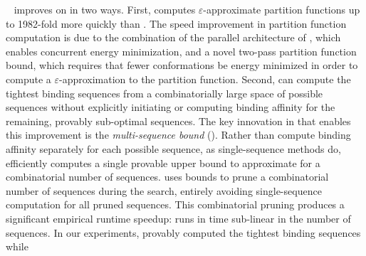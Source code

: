 \bbks~\cite{BBK*} improves on \ks in two ways. First, \bbks computes $\varepsilon$-approximate partition functions up to 1982-fold more quickly than \ks. The speed improvement in partition function computation is due to the combination of the parallel architecture of \bbks, which enables concurrent energy minimization, and a novel two-pass partition function bound, which requires that fewer conformations be energy minimized in order to compute a $\varepsilon$-approximation to the partition function. Second, \bbks can compute the tightest binding sequences from a combinatorially large space of possible sequences without explicitly initiating or computing binding affinity for the remaining, provably sub-optimal sequences. The key innovation in \bbks that enables this improvement is the \emph{multi-sequence bound} (\msbound). Rather than compute binding affinity separately for each possible sequence, as single-sequence methods do, \bbks efficiently computes a single provable upper bound to approximate \ks for a combinatorial number of sequences. \bbks uses \msbound bounds to prune a combinatorial number of sequences during the search, entirely avoiding single-sequence computation for all pruned sequences. This combinatorial pruning produces a significant empirical runtime speedup: \bbks runs in time sub-linear in the number of sequences. In our experiments, \bbks provably computed the tightest binding sequences while 